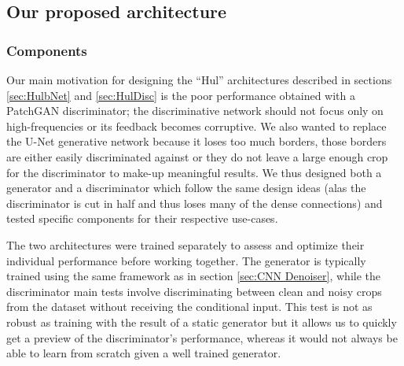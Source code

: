 \subsection{Our proposed architecture}
\subsubsection{Components}\label{sec:Components}
Our main motivation for designing the ``Hul'' architectures described in sections \ref{sec:HulbNet} and \ref{sec:HulDisc} is the poor performance obtained with a PatchGAN discriminator; the discriminative network should not focus only on high-frequencies or its feedback becomes corruptive. We also wanted to replace the U-Net generative network because it loses too much borders, those borders are either easily discriminated against or they do not leave a large enough crop for the discriminator to make-up meaningful results. We thus designed both a generator and a discriminator which follow the same design ideas (alas the discriminator is cut in half and thus loses many of the dense connections) and tested specific components for their respective use-cases.


The two architectures were trained separately to assess and optimize their individual performance before working together. The generator is typically trained using the same framework as in section \ref{sec:CNN Denoiser}, while the discriminator main tests involve discriminating between clean and noisy crops from the dataset without receiving the conditional input. This test is not as robust as training with the result of a static generator but it allows us to quickly get a preview of the discriminator's performance, whereas it would not always be able to learn from scratch given a well trained generator.

